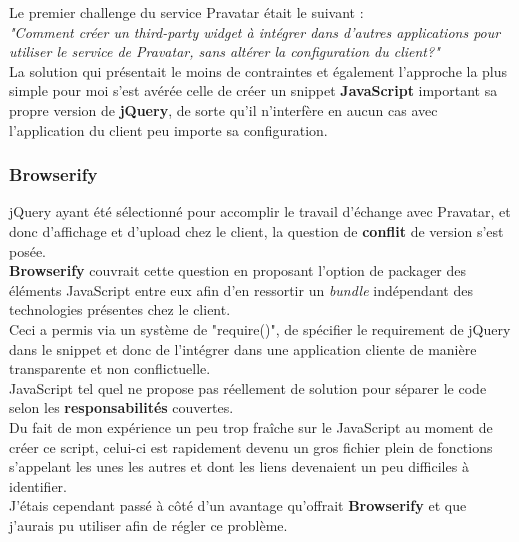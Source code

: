 \documentclass{report}
\begin{document}
      Le premier challenge du service Pravatar était le suivant :\\
      \textit{"Comment créer un third-party widget à intégrer dans d'autres applications pour utiliser le service de Pravatar, sans altérer la configuration du client?"}\\

      La solution qui présentait le moins de contraintes et également l'approche la plus simple pour moi s'est avérée celle de créer un snippet \textbf{JavaScript} important
      sa propre version de \textbf{jQuery}, de sorte qu'il n'interfère en aucun cas avec l'application du client peu importe sa configuration.\\

        \subsubsection{Browserify}
        \label{subs:Browserify}

          jQuery ayant été sélectionné pour accomplir le travail d'échange avec Pravatar, et donc d'affichage et d'upload chez le client, la question de \textbf{conflit} de version s'est posée.\\

          \textbf{Browserify} couvrait cette question en proposant l'option de packager des éléments JavaScript entre eux afin d'en ressortir un
          \textit{bundle} indépendant des technologies présentes chez le client.\\

          Ceci a permis via un système de "require()", de spécifier le requirement de jQuery dans le snippet et donc de l'intégrer dans une application cliente de
          manière transparente et non conflictuelle.\\


          JavaScript tel quel ne propose pas réellement de solution pour séparer le code selon les \textbf{responsabilités} couvertes.\\
          Du fait de mon expérience un peu trop fraîche sur le JavaScript au moment de créer ce script, celui-ci est rapidement
          devenu un gros fichier plein de fonctions s'appelant les unes les autres et dont les liens devenaient un peu difficiles à identifier.\\

          J'étais cependant passé à côté d'un avantage qu'offrait \textbf{Browserify} et que j'aurais pu utiliser afin de régler ce problème.\\
\end{document}
